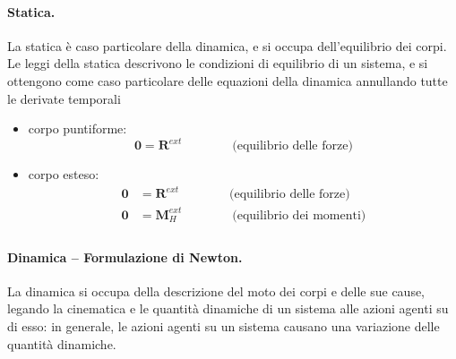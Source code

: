 \paragraph{Statica.} La statica è caso particolare della dinamica, e si occupa dell'equilibrio dei corpi. Le leggi della statica descrivono le condizioni di equilibrio di un sistema, e si ottengono come caso particolare delle equazioni della dinamica annullando tutte le derivate temporali
\begin{itemize}
    \item corpo puntiforme: %
        \begin{equation}
            \mathbf{0} = \mathbf{R}^{ext} \qquad \qquad \text{(equilibrio delle forze)}
        \end{equation}
    \item corpo esteso: %
        \begin{equation}
        \begin{aligned}
            \mathbf{0} & = \mathbf{R}^{ext}   \qquad \qquad \text{(equilibrio delle forze)} \\
            \mathbf{0} & = \mathbf{M}^{ext}_H \qquad \qquad \text{(equilibrio dei momenti)} \\
        \end{aligned}
        \end{equation}
\end{itemize}

\vspace{8pt}
\paragraph{Dinamica -- Formulazione di Newton.} La dinamica si occupa della descrizione del moto dei corpi e delle sue cause, legando la cinematica e le quantità dinamiche di un sistema alle azioni agenti su di esso: in generale, le azioni agenti su un sistema causano una variazione delle quantità dinamiche.

